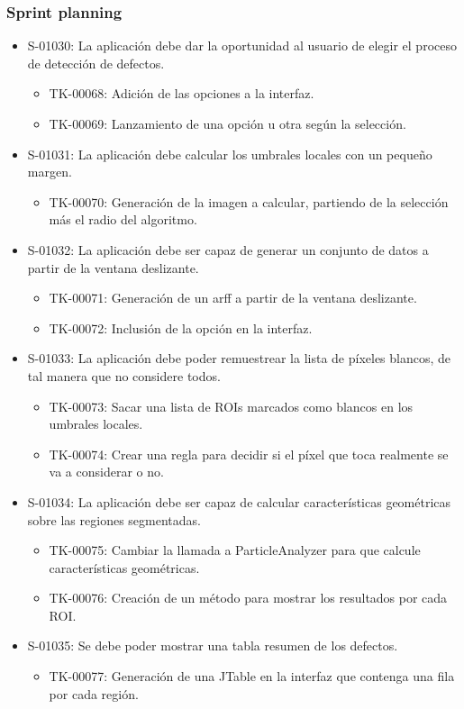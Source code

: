 \subsubsection*{Sprint planning}
\begin{itemize}
 \item S-01030: La aplicación debe dar la oportunidad al usuario de elegir el proceso de detección de defectos.
  \begin{itemize}
   \item TK-00068: Adición de las opciones a la interfaz.
   \item TK-00069: Lanzamiento de una opción u otra según la selección.
  \end{itemize}
 \item S-01031: La aplicación debe calcular los umbrales locales con un pequeño margen.
  \begin{itemize}
   \item TK-00070: Generación de la imagen a calcular, partiendo de la selección más el radio del algoritmo.
  \end{itemize}
 \item S-01032: La aplicación debe ser capaz de generar un conjunto de datos a partir de la ventana deslizante.
 \begin{itemize}
   \item TK-00071: Generación de un arff a partir de la ventana deslizante.
   \item TK-00072: Inclusión de la opción en la interfaz.
  \end{itemize}  
 \item S-01033: La aplicación debe poder remuestrear la lista de píxeles blancos, de tal manera que no considere todos.
 \begin{itemize}
   \item TK-00073: Sacar una lista de ROIs marcados como blancos en los umbrales locales.
   \item TK-00074: Crear una regla para decidir si el píxel que toca realmente se va a considerar o no.
  \end{itemize}
 \item S-01034: La aplicación debe ser capaz de calcular características geométricas sobre las regiones segmentadas.
 \begin{itemize}
  \item TK-00075: Cambiar la llamada a ParticleAnalyzer para que calcule características geométricas.
  \item TK-00076: Creación de un método para mostrar los resultados por cada ROI.
 \end{itemize}
 \item S-01035: Se debe poder mostrar una tabla resumen de los defectos.
  \begin{itemize}
   \item TK-00077: Generación de una JTable en la interfaz que contenga una fila por cada región.
  \end{itemize}
\end{itemize}

